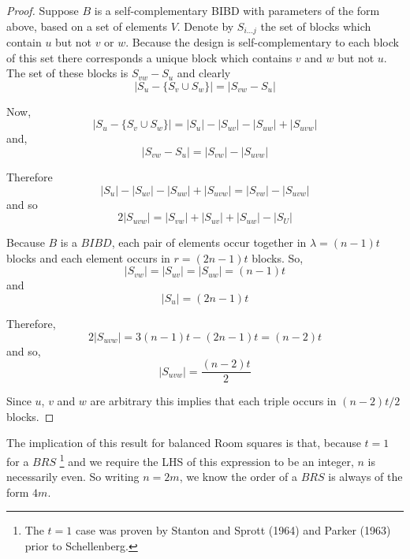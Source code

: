 \documentclass[
  11pt,
  a4paper]{book}\usepackage[]{graphicx}\usepackage[]{xcolor}
\begin{document}
\begin{proof}
Suppose $B$ is a self-complementary BIBD with parameters
of the form above, based on a set of elements $V$. Denote
by $S_{i\ldots j}$ the set of blocks which contain $u$ but
not $v$ or $w$. Because the design is self-complementary to
each block of this set there corresponds a unique block
which contains $v$ and $w$ but not $u$. The set of these
blocks is $S_{vw} - S_u$ and clearly
\begin{equation}
|S_u - \{S_v \cup S_w\}| = |S_{vw} - S_u|
\end{equation}

Now,
\begin{equation}
|S_u-\{S_v \cup S_w\}| = |S_u| - |S_{uv}| -|S_{uw}| + |S_{uvw}|
\end{equation}
and,
\begin{equation}
|S_{vw} - S_u| = |S_{vw}| - |S_{uvw}|
\end{equation}

Therefore
\begin{equation}
|S_u| - |S_{uv}| -|S_{uw}| + |S_{uvw}| = |S_{vw}| - |S_{uvw}|
\end{equation}
and so
\begin{equation}
2|S_{uvw}| = |S_{vw}| + |S_{uv}| + |S_{uw}| - |S_{U}|
\end{equation}

Because $B$ is a $BIBD$, each pair of elements occur
together in $\lambda = (n - 1)t$ blocks and each element
occurs in $r  =(2n - 1)t$ blocks. So,
\begin{equation}
|S_{vw}| = |S_{uv}| = |S_{uw}| = (n - 1)t
\end{equation}
and
\begin{equation}
|S_u| = (2n - 1)t
\end{equation}

Therefore,
\begin{equation}
2|S_{uvw}| = 3(n - 1)t - (2n  -1)t = (n - 2)t
\end{equation}
and so,
\begin{equation}
|S_{uvw}| = \frac{(n - 2)t}{2}
\end{equation}

Since $u$, $v$ and $w$ are arbitrary this implies that each
triple occurs in $(n - 2)t/2$ blocks.
\end{proof}

The implication of this result for balanced Room squares is
that, because $t = 1$ for a $BRS$
\footnote{The $t=1$ case was proven by Stanton and Sprott (1964) and Parker
    (1963) prior to Schellenberg.}
and we require the LHS
of this expression to be an integer, $n$ is necessarily
even. So writing $n = 2m$, we know the order of a $BRS$ is
always of the form $4m$.
\end{document}
